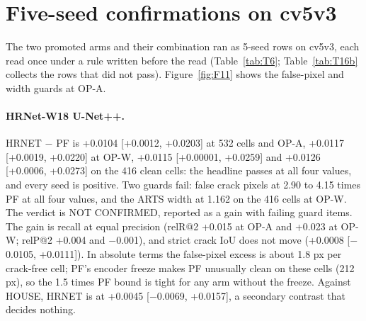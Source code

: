 \section{Five-seed confirmations on cv5v3}\label{sec:m-confirm}

The two promoted arms and their combination ran as 5-seed rows on cv5v3, each read once under a rule written before the read
(Table~\ref{tab:T6}; Table~\ref{tab:T16b} collects the rows that did not pass). Figure~\ref{fig:F11} shows the false-pixel and width guards at OP-A.


\paragraph{HRNet-W18 U-Net++.} HRNET $-$ PF is +0.0104 [+0.0012, +0.0203] at 532 cells and OP-A, +0.0117 [+0.0019, +0.0220] at
OP-W, +0.0115 [+0.00001, +0.0259] and +0.0126 [+0.0006, +0.0273] on the 416 clean cells: the headline passes at all four values,
and every seed is positive. Two guards fail: false crack pixels at 2.90 to 4.15 times PF at all four values, and the ARTS width
at 1.162 on the 416 cells at OP-W. The verdict is NOT CONFIRMED, reported as a gain with failing guard items. The gain is recall
at equal precision (relR@2 +0.015 at OP-A and +0.023 at OP-W; relP@2 +0.004 and $-$0.001), and strict crack IoU does not move
(+0.0008 [$-$0.0105, +0.0111]). In absolute terms the false-pixel excess is about 1.8 px per crack-free cell; PF's encoder freeze
makes PF unusually clean on these cells (212 px), so the 1.5 times PF bound is tight for any arm without the freeze. Against
HOUSE, HRNET is at +0.0045 [$-$0.0069, +0.0157], a secondary contrast that decides nothing.

